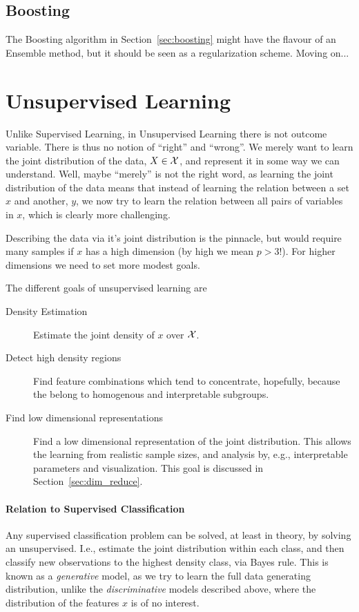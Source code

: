 \subsection{Boosting}
The Boosting algorithm in Section~\ref{sec:boosting} might have the flavour of an Ensemble method, but it should be seen as a regularization scheme. Moving on...







\section{Unsupervised Learning}
\label{sec:unsupervised}

Unlike Supervised Learning, in Unsupervised Learning there is not outcome variable. There is thus no notion of ``right'' and ``wrong''. 
We merely want to learn the joint distribution of the data, $X \in \mathcal{X}$, and represent it in some way we can understand. 
Well, maybe ``merely'' is not the right word, as learning the joint distribution of the data means that instead of learning the relation between a set $x$ and another, $y$, we now try to learn the relation between all pairs of variables in $x$, which is clearly more challenging. 

Describing the data via it's joint distribution is the pinnacle, but would require many samples if $x$ has a high dimension (by high we mean $p>3$!). For higher dimensions we need to set more modest goals.

The different goals of unsupervised learning are
\begin{description}
\item[Density Estimation] Estimate the joint density of $x$ over $\mathcal{X}$.
\item[Detect high density regions] Find feature combinations which tend to concentrate, hopefully, because the belong to homogenous and interpretable subgroups.
\item[Find low dimensional representations] Find a low dimensional representation of the joint distribution. This allows the learning from realistic sample sizes, and analysis by, e.g., interpretable parameters and visualization.
This goal is discussed in Section~\ref{sec:dim_reduce}.
\end{description}


\paragraph{Relation to Supervised Classification}
Any supervised classification problem can be solved, at least in theory, by solving an unsupervised. 
I.e., estimate the joint distribution within each class, and then classify new observations to the highest density class, via Bayes rule. 
This is known as a \emph{generative} model, as we try to learn the full data generating distribution, unlike the \emph{discriminative} models described above, where the distribution of the features $x$ is of no interest.





